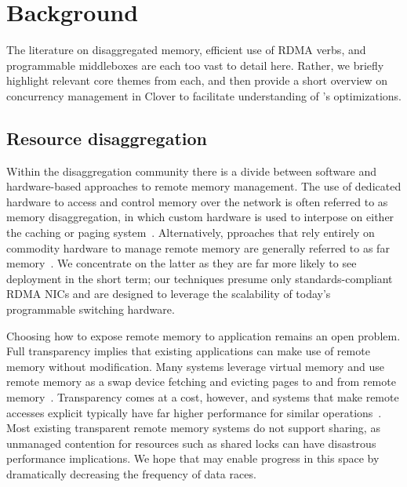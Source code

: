 \section{Background}

The literature on disaggregated memory, efficient use of RDMA verbs,
and programmable middleboxes are each too vast to detail here.
Rather, we briefly highlight relevant core themes from each, and then
provide a short overview on concurrency management in Clover to
facilitate understanding of \sword's optimizations.

\subsection{Resource disaggregation}

Within the disaggregation community there is a divide between software
and hardware-based approaches to remote memory management.  The use of
dedicated hardware to access and control memory over the network is
often referred to as memory disaggregation, in which custom hardware
is used to interpose on either the caching or paging
system~\cite{dredbox,rethinking}.  Alternatively, pproaches that rely
entirely on commodity hardware to manage remote memory are generally
referred to as far memory~\cite{reigons,fastswap, legoos,
  clover, lite}.  We concentrate on the latter as they are far more
likely to see deployment in the short term; our techniques presume
only standards-compliant RDMA NICs and are designed to leverage the
scalability of today's programmable switching hardware.

Choosing how to expose remote memory to application remains an open
problem. Full transparency implies that existing applications can make
use of remote memory without modification. Many systems leverage
virtual memory and use remote memory as a swap device fetching and
evicting pages to and from remote
memory~\cite{fastswap,GMS,infiniswap,leap,ramcloud}. Transparency
comes at a cost, however, and systems that make remote accesses
explicit typically have far higher performance for similar
operations~\cite{aifm}.  Most existing transparent remote memory
systems do not support sharing, as unmanaged contention for resources
such as shared locks can have disastrous performance implications.  We
hope that {\sword} may enable progress in this space by dramatically
decreasing the frequency of data races.


